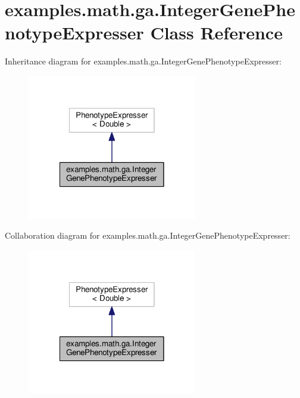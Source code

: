 \hypertarget{classexamples_1_1math_1_1ga_1_1_integer_gene_phenotype_expresser}{\section{examples.\-math.\-ga.\-Integer\-Gene\-Phenotype\-Expresser Class Reference}
\label{classexamples_1_1math_1_1ga_1_1_integer_gene_phenotype_expresser}
}


Inheritance diagram for examples.\-math.\-ga.\-Integer\-Gene\-Phenotype\-Expresser\-:
\nopagebreak
\begin{figure}[H]
\begin{center}
\leavevmode
\includegraphics[width=210pt]{classexamples_1_1math_1_1ga_1_1_integer_gene_phenotype_expresser__inherit__graph}
\end{center}
\end{figure}


Collaboration diagram for examples.\-math.\-ga.\-Integer\-Gene\-Phenotype\-Expresser\-:
\nopagebreak
\begin{figure}[H]
\begin{center}
\leavevmode
\includegraphics[width=210pt]{classexamples_1_1math_1_1ga_1_1_integer_gene_phenotype_expresser__coll__graph}
\end{center}
\end{figure}
